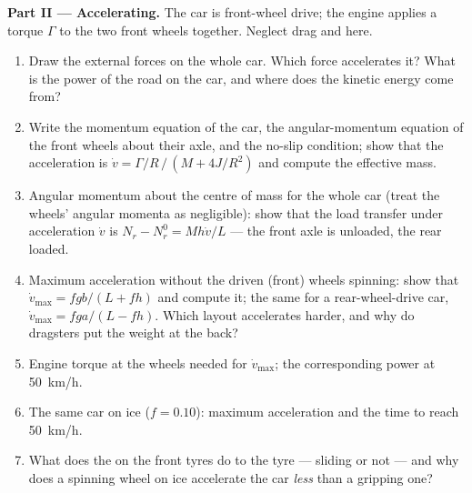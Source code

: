 \begin{problem}
\medskip
\noindent\textbf{Part II --- Accelerating.}
The car is front-wheel drive; the engine applies a torque $\Gamma$ to
the two front wheels together. Neglect drag and  here.
\begin{enumerate}[resume]
  \item Draw the external forces on the whole car. Which force
        accelerates it? What is the power of the road on the car, and
        where does the kinetic energy come from?
  \item Write the momentum equation of the car, the angular-momentum
        equation of the front wheels about their axle, and the
        no-slip condition; show that the acceleration is $\dot v =
        \Gamma/R\,/\,(M + 4J/R^2)$ and compute the effective mass.
  \item Angular momentum about the centre of mass for the whole car
        (treat the wheels' angular momenta as negligible): show that
        the load transfer under acceleration $\dot v$ is $N_r - N_r^0 =
        Mh\dot v/L$ --- the front axle is unloaded, the rear loaded.
  \item Maximum acceleration without the driven (front) wheels
        spinning: show that $\dot v_{\max} = fgb/(L + fh)$ and compute
        it; the same for a rear-wheel-drive car, $\dot v_{\max} =
        fga/(L - fh)$. Which layout accelerates harder, and why do
        dragsters put the weight at the back?
  \item Engine torque at the wheels needed for $\dot v_{\max}$; the
        corresponding power at \qty{50}{km/h}.
  \item The same car on ice ($f = 0.10$): maximum acceleration and the
        time to reach \qty{50}{km/h}.
  \item What does the  on the front tyres do to the tyre
        --- sliding or not --- and why does a spinning wheel on ice
        accelerate the car \emph{less} than a gripping one?
\end{enumerate}


\end{problem}
